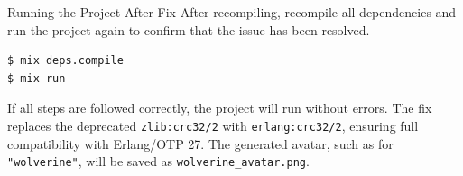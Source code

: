 \documentclass[aspectratio=169, table]{beamer}
\begin{document}
\begin{frame}[fragile]{Running the Project After Fix}
\vspace{20pt}
\small
After recompiling, recompile all dependencies and run the project again  
to confirm that the issue has been resolved.

\begin{lstlisting}[language=bash, basicstyle=\ttfamily\scriptsize]
$ mix deps.compile
$ mix run
\end{lstlisting}

If all steps are followed correctly, the project will run without errors.  
The fix replaces the deprecated \texttt{zlib:crc32/2} with \texttt{erlang:crc32/2},  
ensuring full compatibility with Erlang/OTP 27.  
The generated avatar, such as for \texttt{"wolverine"}, will be saved as  
\texttt{wolverine\_avatar.png}.
\end{frame}
\end{document}
